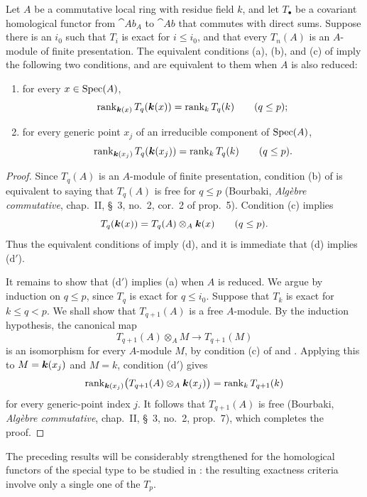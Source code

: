 \begin{proposition}[7.3.11]
\label{III.7.3.11}
Let $A$ be a commutative local ring with residue field $k$,
and let $T_\bullet$ be a covariant homological functor from
$\cat{Ab}_A$ to $\cat{Ab}$ that commutes with direct sums.
Suppose there is an $i_0$ such that $T_i$ is exact for
$i\leq i_0$, and that every $T_n(A)$ is an $A$-module of
finite presentation.  The equivalent conditions (a), (b), and
(c) of  imply the following two conditions,
and are equivalent to them when $A$ is also reduced:
\begin{enumerate}
  \item[(d)] for every $x\in\operatorname{Spec}(A)$,
    \[
      \operatorname{rank}_{\boldsymbol{k}(x)}
      T_q(\boldsymbol{k}(x))
      =
      \operatorname{rank}_k T_q(k)
      \qquad(q\leq p);
    \]
  \item[($\mathrm{d}'$)] for every generic point $x_j$ of an
    irreducible component of $\operatorname{Spec}(A)$,
    \[
      \operatorname{rank}_{\boldsymbol{k}(x_j)}
      T_q(\boldsymbol{k}(x_j))
      =
      \operatorname{rank}_k T_q(k)
      \qquad(q\leq p).
    \]
\end{enumerate}
\end{proposition}

\begin{proof}
Since $T_q(A)$ is an $A$-module of finite presentation,
condition (b) of  is equivalent to saying that
$T_q(A)$ is free for $q\leq p$ (Bourbaki,
\emph{Alg\`ebre commutative}, chap.~II, \S~3, no.~2, cor.~2
of prop.~5).  Condition (c) implies
\[
  T_q(\boldsymbol{k}(x))
  =
  T_q(A)\otimes_A\boldsymbol{k}(x)
  \qquad(q\leq p).
\]
Thus the equivalent conditions of  imply (d),
and it is immediate that (d) implies ($\mathrm{d}'$).

It remains to show that ($\mathrm{d}'$) implies (a) when $A$ is
reduced.  We argue by induction on $q\leq p$, since $T_q$ is
exact for $q\leq i_0$.  Suppose that $T_k$ is exact for
$k\leq q<p$.  We shall show that $T_{q+1}(A)$ is a free
$A$-module.  By the induction hypothesis, the canonical map
\[
  T_{q+1}(A)\otimes_A M
  \longrightarrow
  T_{q+1}(M)
\]
is an isomorphism for every $A$-module $M$, by condition (c) of
 and .  Applying this to
$M=\boldsymbol{k}(x_j)$ and $M=k$, condition ($\mathrm{d}'$) gives
\[
  \operatorname{rank}_{\boldsymbol{k}(x_j)}
  \bigl(T_{q+1}(A)\otimes_A\boldsymbol{k}(x_j)\bigr)
  =
  \operatorname{rank}_k T_{q+1}(k)
\]
for every generic-point index $j$.  It follows that
$T_{q+1}(A)$ is free (Bourbaki,
\emph{Alg\`ebre commutative}, chap.~II, \S~3, no.~2, prop.~7),
which completes the proof.
\end{proof}

The preceding results will be considerably strengthened for
the homological functors of the special type to be studied in
: the resulting exactness criteria involve only
a single one of the $T_p$.
